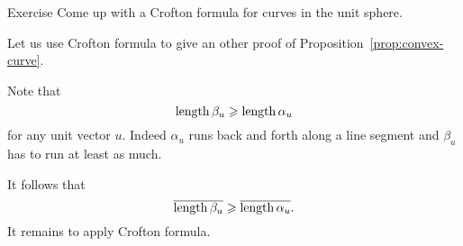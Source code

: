 \begin{thm}{Exercise}
Come up with a Crofton formula for curves in the unit sphere.
\end{thm}



Let us use Crofton formula to give an other proof of Proposition~\ref{prop:convex-curve}.

Note that 
\[\mathop{\rm length}\nolimits \beta_u\geqslant \mathop{\rm length}\nolimits \alpha_u\]
for any unit vector $u$.
Indeed $\alpha_u$ runs back and forth along a line segment and $\beta_u$ has to run at least as much.

It follows that 
\[\overline{\mathop{\rm length}\nolimits \beta_u}\geqslant \overline{\mathop{\rm length}\nolimits \alpha_u}.\]
It remains to apply Crofton formula.
\qeds







